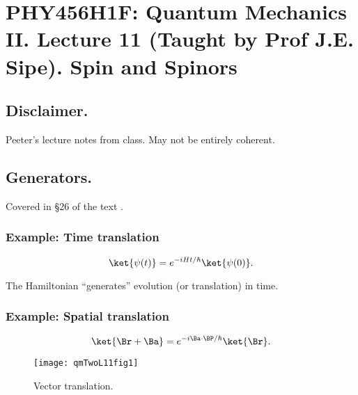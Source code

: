%
%

\chapter{PHY456H1F: Quantum Mechanics II.  Lecture 11 (Taught by Prof J.E. Sipe).  Spin and Spinors}
\label{chap:qmTwoL11}
{}
\date{Oct 17, 2011}

\beginArtWithToc

\section{Disclaimer.}

Peeter's lecture notes from class.  May not be entirely coherent.

\section{Generators.}

Covered in \S 26 of the text \cite{desai2009quantum}.

\subsection{Example: Time translation}

\begin{equation}\label{eqn:qmTwoL11:10}
\ket{\psi(t)} = e^{-i H t/\hbar} \ket{\psi(0)} .
\end{equation}

The Hamiltonian ``generates'' evolution (or translation) in time.

\subsection{Example: Spatial translation}

\begin{equation}\label{eqn:qmTwoL11:30}
\ket{\Br + \Ba} = 
e^{-i \Ba \cdot \BP/\hbar} 
\ket{\Br}.
\end{equation}

\begin{figure}[htp]
   \centering
   \texttt{[image: qmTwoL11fig1]}
   \caption{Vector translation.}
\label{fig:qmTwoL11:qmTwoL11fig1}
\end{figure}

